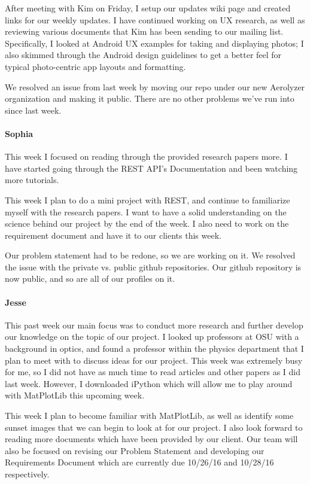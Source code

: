 \documentclass[onecolumn, draftclsnofoot,10pt, compsoc]{IEEEtran}
\begin{document}
\begin{flushleft}
After meeting with Kim on Friday, I setup our updates wiki page and created links for our weekly updates. I have continued working on UX research, as well as reviewing various documents that Kim has been sending to our mailing list. Specifically, I looked at Android UX examples for taking and displaying photos; I also skimmed through the Android design guidelines to get a better feel for typical photo-centric app layouts and formatting.
 
 
We resolved an issue from last week by moving our repo under our new Aerolyzer organization and making it public. There are no other problems we've run into since last week.
 
\paragraph{Sophia}
 
This week I focused on reading through the provided research papers more. I have started going through the REST API's Documentation and been watching more tutorials.
 
 
This week I plan to do a mini project with REST, and continue to familiarize myself with the research papers. I want to have a solid understanding on the science behind our project by the end of the week. I also need to work on the requirement document and have it to our clients this week.
 
 
Our problem statement had to be redone, so we are working on it. We resolved the issue with the private vs. public github repositories. Our github repository is now public, and so are all of our profiles on it.
 
\paragraph{Jesse}
 
This past week our main focus was to conduct more research and further develop our knowledge on the topic of our project. I looked up professors at OSU with a background in optics, and found a professor within the physics department that I plan to meet with to discuss ideas for our project. This week was extremely busy for me, so I did not have as much time to read articles and other papers as I did last week. However, I downloaded iPython which will allow me to play around with MatPlotLib this upcoming week.
 
 
This week I plan to become familiar with MatPlotLib, as well as identify some sunset images that we can begin to look at for our project. I also look forward to reading more documents which have been provided by our client. Our team will also be focused on revising our Problem Statement and developing our Requirements Document which are currently due 10/26/16 and 10/28/16 respectively.
 

\end{flushleft}
\end{document}
